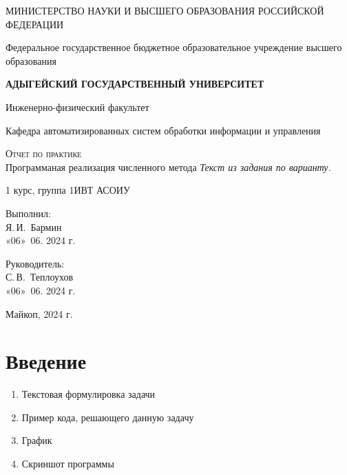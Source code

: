 \documentclass{article}
\begin{document}
  \begin{titlepage}
    \begin{center}
      \large
      МИНИСТЕРСТВО НАУКИ И ВЫСШЕГО ОБРАЗОВАНИЯ РОССИЙСКОЙ ФЕДЕРАЦИИ
      
      Федеральное государственное бюджетное образовательное учреждение высшего образования
      
      \textbf{АДЫГЕЙСКИЙ ГОСУДАРСТВЕННЫЙ УНИВЕРСИТЕТ}
      \vspace{0.25cm}
      
      Инженерно-физический факультет
      
      Кафедра автоматизированных систем обработки информации и управления
      \vfill

      \vfill
      
      \textsc{Отчет по практике}\\[5mm]
      
      {\LARGE Программаная реализация численного метода \textit{Текст из задания по варианту.}}
      \bigskip
      
      1 курс, группа 1ИВТ АСОИУ
    \end{center}
    \vfill
    
    \newlength{\ML}
    \hfill\begin{minipage}{0.5\textwidth}
      Выполнил:\\
      \underline{\hspace{\ML}}Я.\,И.~Бармин\\
      «06» \,06. 2024 г.
    \end{minipage}%
    \bigskip
    
    \hfill\begin{minipage}{0.5\textwidth}
      Руководитель:\\
      \underline{\hspace{\ML}} С.\,В.~Теплоухов\\
      «06» \,06. 2024 г.
    \end{minipage}%
    \vfill
    
    \begin{center}
      Майкоп, 2024 г.
    \end{center}
  \end{titlepage}
 \section{Введение}
\label{sec:intro}
\begin{enumerate}
 \item Текстовая формулировка задачи
 \item Пример кода, решающего данную задачу
 \item График
 \item Скриншот программы
\end{enumerate}
\end{document}
